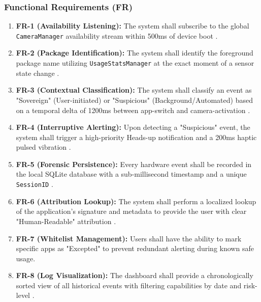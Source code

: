 \documentclass[12pt,a4paper]{report}
\begin{document}
\begin{enumerate}
    \subsubsection{Functional Requirements (FR)}
    \begin{enumerate}
        \item \textbf{FR-1 (Availability Listening):} The system shall subscribe to the global \texttt{CameraManager} availability stream within 500ms of device boot \cite{androidhal}.
        \item \textbf{FR-2 (Package Identification):} The system shall identify the foreground package name utilizing \texttt{UsageStatsManager} at the exact moment of a sensor state change \cite{contextaware}.
        \item \textbf{FR-3 (Contextual Classification):} The system shall classify an event as "Sovereign" (User-initiated) or "Suspicious" (Background/Automated) based on a temporal delta of 1200ms between app-switch and camera-activation \cite{contextaware}.
        \item \textbf{FR-4 (Interruptive Alerting):} Upon detecting a "Suspicious" event, the system shall trigger a high-priority Heads-up notification and a 200ms haptic pulsed vibration \cite{privacydot}.
        \item \textbf{FR-5 (Forensic Persistence):} Every hardware event shall be recorded in the local SQLite database with a sub-millisecond timestamp and a unique \texttt{SessionID} \cite{smarthome}.
        \item \textbf{FR-6 (Attribution Lookup):} The system shall perform a localized lookup of the application's signature and metadata to provide the user with clear "Human-Readable" attribution \cite{taintdroid}.
        \item \textbf{FR-7 (Whitelist Management):} Users shall have the ability to mark specific apps as "Excepted" to prevent redundant alerting during known safe usage.
        \item \textbf{FR-8 (Log Visualization):} The dashboard shall provide a chronologically sorted view of all historical events with filtering capabilities by date and risk-level \cite{smarthome}.
    \end{enumerate}


\end{enumerate}
\end{document}
